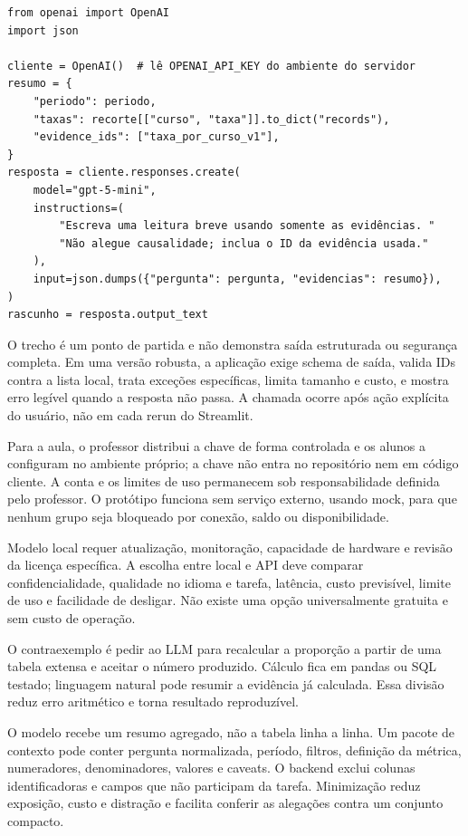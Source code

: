 \begin{verbatim}
from openai import OpenAI
import json

cliente = OpenAI()  # lê OPENAI_API_KEY do ambiente do servidor
resumo = {
    "periodo": periodo,
    "taxas": recorte[["curso", "taxa"]].to_dict("records"),
    "evidence_ids": ["taxa_por_curso_v1"],
}
resposta = cliente.responses.create(
    model="gpt-5-mini",
    instructions=(
        "Escreva uma leitura breve usando somente as evidências. "
        "Não alegue causalidade; inclua o ID da evidência usada."
    ),
    input=json.dumps({"pergunta": pergunta, "evidencias": resumo}),
)
rascunho = resposta.output_text
\end{verbatim}

O trecho é um ponto de partida e não demonstra saída estruturada ou segurança completa. Em uma versão robusta, a aplicação exige schema de saída, valida IDs contra a lista local, trata exceções específicas, limita tamanho e custo, e mostra erro legível quando a resposta não passa. A chamada ocorre após ação explícita do usuário, não em cada rerun do Streamlit.

Para a aula, o professor distribui a chave de forma controlada e os alunos a configuram no ambiente próprio; a chave não entra no repositório nem em código cliente. A conta e os limites de uso permanecem sob responsabilidade definida pelo professor. O protótipo funciona sem serviço externo, usando mock, para que nenhum grupo seja bloqueado por conexão, saldo ou disponibilidade.

Modelo local requer atualização, monitoração, capacidade de hardware e revisão da licença específica. A escolha entre local e API deve comparar confidencialidade, qualidade no idioma e tarefa, latência, custo previsível, limite de uso e facilidade de desligar. Não existe uma opção universalmente gratuita e sem custo de operação.

O contraexemplo é pedir ao LLM para recalcular a proporção a partir de uma tabela extensa e aceitar o número produzido. Cálculo fica em pandas ou SQL testado; linguagem natural pode resumir a evidência já calculada. Essa divisão reduz erro aritmético e torna resultado reproduzível.

O modelo recebe um resumo agregado, não a tabela linha a linha. Um pacote de contexto pode conter pergunta normalizada, período, filtros, definição da métrica, numeradores, denominadores, valores e caveats. O backend exclui colunas identificadoras e campos que não participam da tarefa. Minimização reduz exposição, custo e distração e facilita conferir as alegações contra um conjunto compacto.

